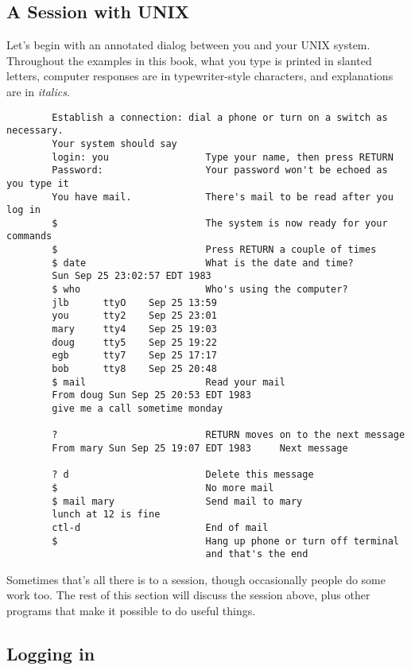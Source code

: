 \subsection{A Session with UNIX}

Let's begin with an annotated dialog between you and your UNIX system.
Throughout the examples in this book, what you type is printed in slanted
letters, computer responses are in typewriter-style characters, and explanations
are in \textit{italics}.

\begin{verbatim}
        Establish a connection: dial a phone or turn on a switch as necessary.
        Your system should say
        login: you                 Type your name, then press RETURN
        Password:                  Your password won't be echoed as you type it
        You have mail.             There's mail to be read after you log in
        $                          The system is now ready for your commands
        $                          Press RETURN a couple of times
        $ date                     What is the date and time?
        Sun Sep 25 23:02:57 EDT 1983
        $ who                      Who's using the computer?
        jlb      ttyO    Sep 25 13:59
        you      tty2    Sep 25 23:01
        mary     tty4    Sep 25 19:03
        doug     tty5    Sep 25 19:22
        egb      tty7    Sep 25 17:17
        bob      tty8    Sep 25 20:48
        $ mail                     Read your mail
        From doug Sun Sep 25 20:53 EDT 1983
        give me a call sometime monday

        ?                          RETURN moves on to the next message
        From mary Sun Sep 25 19:07 EDT 1983     Next message

        ? d                        Delete this message
        $                          No more mail
        $ mail mary                Send mail to mary
        lunch at 12 is fine
        ctl-d                      End of mail
        $                          Hang up phone or turn off terminal
                                   and that's the end
\end{verbatim}
Sometimes that's all there is to a session, though occasionally people do some
work too. The rest of this section will discuss the session above, plus other
programs that make it possible to do useful things.


\subsection{Logging in}

